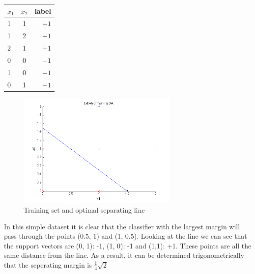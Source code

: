 \documentclass{article}
\begin{document}
\begin{center}
  \begin{tabular}{ | l | c | r |}
   \hline
    $x_1$ & $x_2$ & label \\ \hline
    1 & 1 & $+1$\\ 
    1 & 2 & $+1$ \\ 
    2 & 1 & $+1$ \\
    0 & 0 & $-1$ \\ 
    1 & 0 & $-1$ \\ 
    0 & 1 & $-1$ \\ 
    \hline
  \end{tabular}
\end{center}

\begin{figure}[H]
  \centering
      \includegraphics[width=0.7\textwidth]{SVMplot}
  \caption{Training set and optimal separating line}
\end{figure}

In this simple dataset it is clear that the classifier with the largest margin will pass through the points (0.5, 1) and (1, 0.5). 
Looking at the line we can see that the support vectors are (0, 1): -1, (1, 0): -1 and (1,1): +1. 
These points are all the same distance from the line.
As a result, it can be determined trigonometrically that the seperating margin is $\frac{1}{4}\sqrt{2}$
\end{document}
